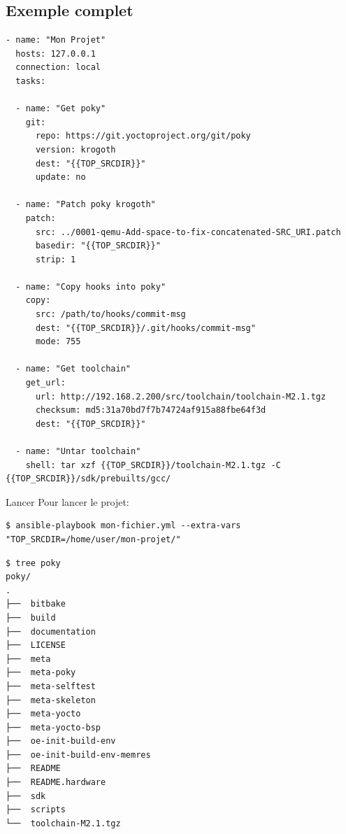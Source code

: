 \documentclass[compress]{smilebeamer}
\begin{document}
\subsection{Exemple complet}
\begin{frame}[fragile]
\begin{lstlisting}[style=bitbake,basicstyle=\tiny\ttfamily\color{white}]
- name: "Mon Projet"
  hosts: 127.0.0.1
  connection: local
  tasks:

  - name: "Get poky"
    git:
      repo: https://git.yoctoproject.org/git/poky
      version: krogoth
      dest: "{{TOP_SRCDIR}}"
      update: no

  - name: "Patch poky krogoth"
    patch:
      src: ../0001-qemu-Add-space-to-fix-concatenated-SRC_URI.patch
      basedir: "{{TOP_SRCDIR}}"
      strip: 1

  - name: "Copy hooks into poky"
    copy:
      src: /path/to/hooks/commit-msg
      dest: "{{TOP_SRCDIR}}/.git/hooks/commit-msg"
      mode: 755

  - name: "Get toolchain"
    get_url:
      url: http://192.168.2.200/src/toolchain/toolchain-M2.1.tgz
      checksum: md5:31a70bd7f7b74724af915a88fbe64f3d
      dest: "{{TOP_SRCDIR}}"

  - name: "Untar toolchain"
    shell: tar xzf {{TOP_SRCDIR}}/toolchain-M2.1.tgz -C {{TOP_SRCDIR}}/sdk/prebuilts/gcc/
\end{lstlisting}
\end{frame}

\begin{frame}[fragile]{Lancer}
Pour lancer le projet:
\begin{lstlisting}[style=shell]
$ ansible-playbook mon-fichier.yml --extra-vars "TOP_SRCDIR=/home/user/mon-projet/"
\end{lstlisting}

\begin{lstlisting}[style=shell,basicstyle=\tiny\ttfamily\color{white}]
$ tree poky
poky/
.
├──  bitbake
├──  build
├──  documentation
├──  LICENSE
├──  meta
├──  meta-poky
├──  meta-selftest
├──  meta-skeleton
├──  meta-yocto
├──  meta-yocto-bsp
├──  oe-init-build-env
├──  oe-init-build-env-memres
├──  README
├──  README.hardware
├──  sdk
├──  scripts
└──  toolchain-M2.1.tgz
\end{lstlisting}
\end{frame}



\end{document}
